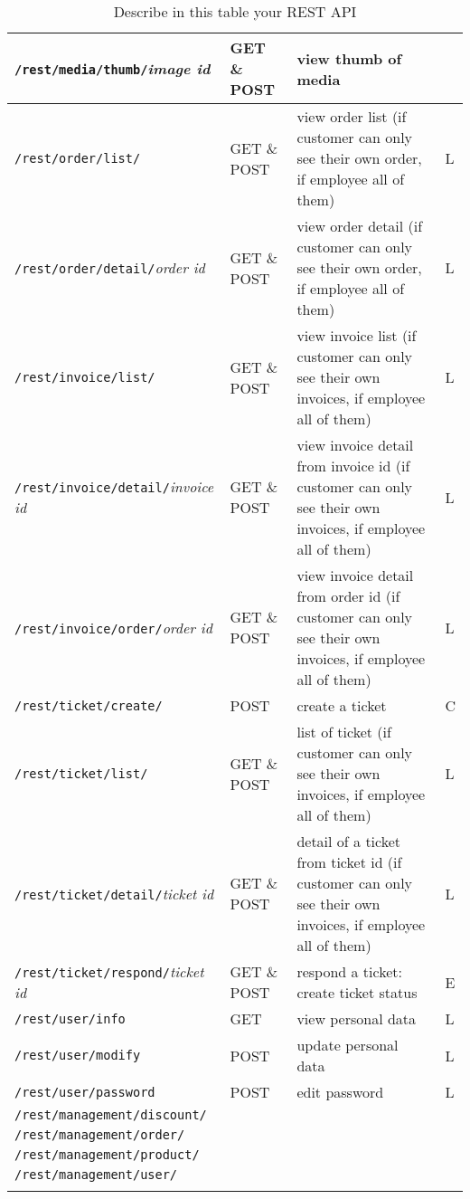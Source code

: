\begin{longtable}{|p{}|p{} |p{}|p{}|}
\texttt{/rest/media/thumb/}\textit{image id} & GET \& POST & view thumb of media &  \\\hline
\texttt{/rest/order/list/} & GET \& POST & view order list (if customer can only see their own order, if employee all of them) & L\\\hline
\texttt{/rest/order/detail/}\textit{order id} & GET \& POST & view order detail (if customer can only see their own order, if employee all of them) & L\\\hline
\texttt{/rest/invoice/list/} & GET \& POST & view invoice list (if customer can only see their own invoices, if employee all of them) & L\\\hline
\texttt{/rest/invoice/detail/}\textit{invoice id} & GET \& POST & view invoice detail from invoice id (if customer can only see their own invoices, if employee all of them) & L\\\hline
\texttt{/rest/invoice/order/}\textit{order id} & GET \& POST & view invoice detail from order id (if customer can only see their own invoices, if employee all of them) & L\\\hline
\texttt{/rest/ticket/create/} & POST  & create a ticket & C \\\hline
\texttt{/rest/ticket/list/} & GET \& POST  & list of ticket (if customer can only see their own invoices, if employee all of them) & L \\\hline
\texttt{/rest/ticket/detail/}\textit{ticket id} & GET \& POST & detail of a ticket from ticket id (if customer can only see their own invoices, if employee all of them) & L \\\hline
\texttt{/rest/ticket/respond/}\textit{ticket id} & GET \& POST & respond a ticket: create ticket status & E \\\hline
\texttt{/rest/user/info} & GET & view personal data & L \\\hline
\texttt{/rest/user/modify} & POST & update personal data & L\\\hline
\texttt{/rest/user/password} & POST & edit password & L\\\hline
\texttt{/rest/management/discount/} & & &\\\hline
\texttt{/rest/management/order/} & & &\\\hline
\texttt{/rest/management/product/} & & &\\\hline
\texttt{/rest/management/user/} & & &\\\hline

\caption{Describe in this table your REST API}
\label{tab:termGlossary}
\end{longtable}